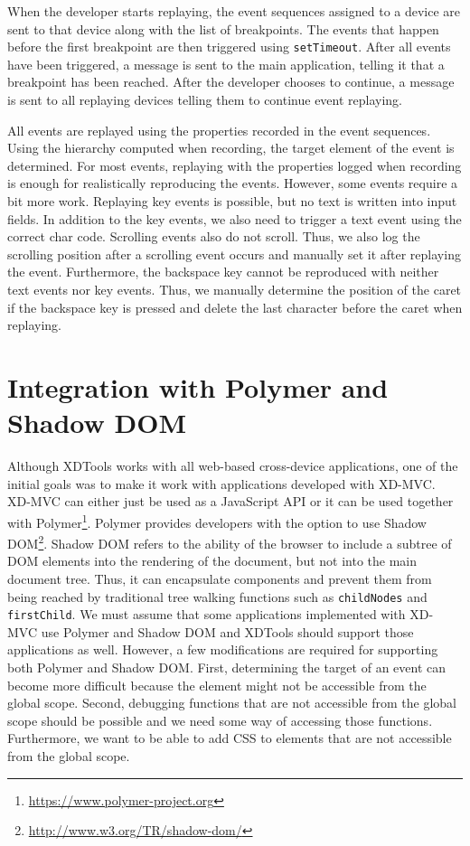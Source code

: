 When the developer starts replaying, the event sequences assigned to a device are sent to that device along with the list of breakpoints. The events that happen before the first breakpoint are then triggered using \lstinline|setTimeout|. After all events have been triggered, a message is sent to the main application, telling it that a breakpoint has been reached. After the developer chooses to continue, a message is sent to all replaying devices telling them to continue event replaying.

All events are replayed using the properties recorded in the event sequences. Using the hierarchy computed when recording, the target element of the event is determined. For most events, replaying with the properties logged when recording is enough for realistically reproducing the events. However, some events require a bit more work. Replaying key events is possible, but no text is written into input fields. In addition to the key events, we also need to trigger a text event using the correct char code. Scrolling events also do not scroll. Thus, we also log the scrolling position after a scrolling event occurs and manually set it after replaying the event. Furthermore, the backspace key cannot be reproduced with neither text events nor key events. Thus, we manually determine the position of the caret if the backspace key is pressed and delete the last character before the caret when replaying. 

\section{Integration with Polymer and Shadow DOM}

Although XDTools works with all web-based cross-device applications, one of the initial goals was to make it work with applications developed with XD-MVC. XD-MVC can either just be used as a JavaScript API or it can be used together with Polymer\footnote{\url{https://www.polymer-project.org}}. Polymer provides developers with the option to use Shadow DOM\footnote{\url{http://www.w3.org/TR/shadow-dom/}}. Shadow DOM refers to the ability of the browser to include a subtree of DOM elements into the rendering of the document, but not into the main document tree. Thus, it can encapsulate components and prevent them from being reached by traditional tree walking functions such as \lstinline|childNodes| and \lstinline|firstChild|. We must assume that some applications implemented with XD-MVC use Polymer and Shadow DOM and XDTools should support those applications as well. However, a few modifications are required for supporting both Polymer and Shadow DOM. First, determining the target of an event can become more difficult because the element might not be accessible from the global scope. Second, debugging functions that are not accessible from the global scope should be possible and we need some way of accessing those functions. Furthermore, we want to be able to add CSS to elements that are not accessible from the global scope.

